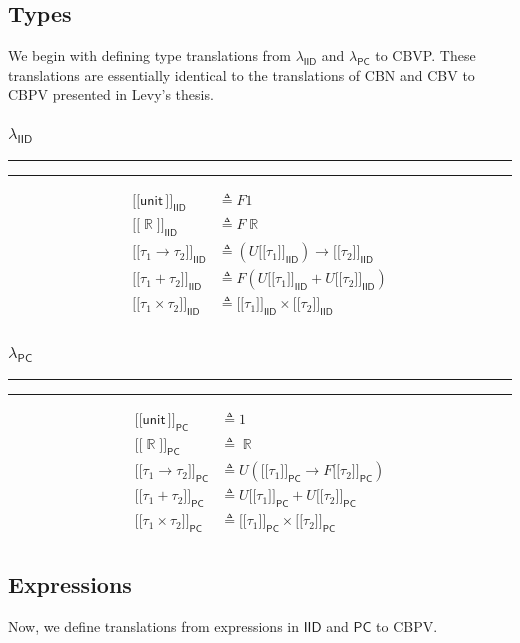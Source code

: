 \documentclass{article}
\DeclareMathOperator*\R{\mathbb{R}}
\newcommand{\iid}{\mathsf{IID}}
\newcommand{\pc}{\mathsf{PC}}
\newcommand{\unit}{\mathsf{unit\,}}
\newcommand{\1}{\mathsf{\,\#1\,}}
\newcommand{\2}{\mathsf{\,\#2\,}}
\newcommand{\semiid}[1]{[\![ #1 {]\!]}_{\mathsf{IID}}}
\newcommand{\sempc}[1]{[\![ #1 {]\!]}_{\mathsf{PC}}}
\begin{document}
\subsection{Types}
We begin with defining type translations from $\lambda_{\iid}$ and $\lambda_{\pc}$ to CBVP.
These translations are essentially identical to the translations of CBN and CBV to CBPV presented in Levy's thesis.


\begin{multicols}{2}
\subsubsection*{$\lambda_\iid$}
\hrule\hrule
\medskip
	\begin{equation*}
		\begin{split}
			\semiid{\unit} &\triangleq F 1 \\
			\semiid{\R} &\triangleq F \R \\
			\semiid{\tau_1 \to \tau_2} &\triangleq (U \semiid{\tau_1}) \to \semiid{\tau_2} \\
			\semiid{\tau_1 + \tau_2} &\triangleq F(U \semiid{\tau_1} + U \semiid{\tau_2}) \\
			\semiid{\tau_1 \times \tau_2} &\triangleq \semiid{\tau_1} \times \semiid{\tau_2} \\
		\end{split}
	\end{equation*}
		
\subsubsection*{$\lambda_\pc$}
\hrule\hrule
\medskip
	\begin{equation*}
		\begin{split}
			\sempc{\unit} &\triangleq 1 \\
			\sempc{\R} &\triangleq \R \\
			\sempc{\tau_1 \to \tau_2} &\triangleq U (\sempc{\tau_1} \to F\sempc{\tau_2}) \\
			\sempc{\tau_1 + \tau_2} &\triangleq U\sempc{\tau_1} + U\sempc{\tau_2} \\
			\sempc{\tau_1 \times \tau_2} &\triangleq \sempc{\tau_1} \times \sempc{\tau_2} \\
		\end{split}
	\end{equation*}
\end{multicols}

\subsection{Expressions}
Now, we define translations from expressions in $\iid$ and $\pc$
to CBPV.
\end{document}
